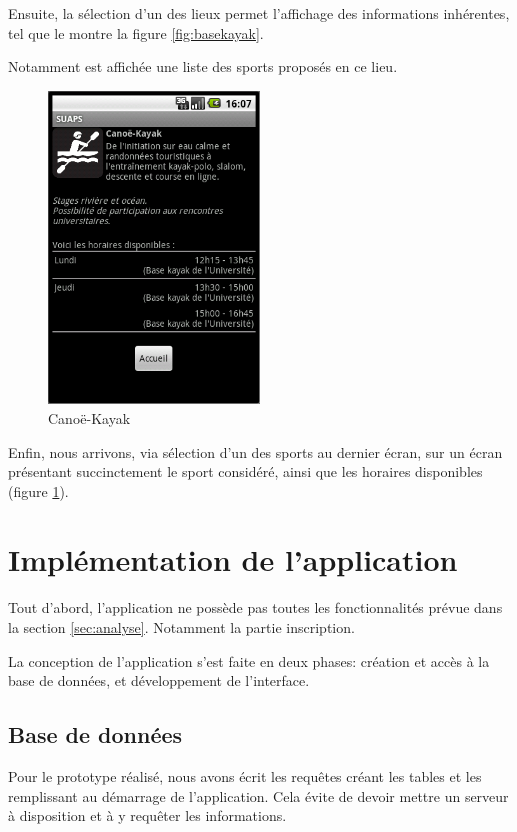 \documentclass[french, titlepage, 11pt, a4paper]{article}
\begin{document}
	Ensuite, la sélection d'un des lieux permet l'affichage des informations
	inhérentes, tel que le montre la figure \ref{fig:basekayak}.

	Notamment est affichée une liste des sports proposés en ce lieu.

	\begin{figure}[ht]
		\centering
		\includegraphics[width=0.5\textwidth]{canoekayak.png}
		\caption{Canoë-Kayak}
		\label{fig:canoekayak}
	\end{figure}

	Enfin, nous arrivons, via sélection d'un des sports au dernier écran, sur un
	écran présentant succinctement le sport considéré, ainsi que les horaires
	disponibles (figure \ref{fig:canoekayak}).

\section{Implémentation de l'application}

    Tout d'abord, l'application ne possède pas toutes les fonctionnalités prévue
    dans la section \ref{sec:analyse}. Notamment la partie inscription.


    La conception de l'application s'est faite en deux phases: création et accès
    à la base de données, et développement de l'interface.

    \subsection{Base de données}

        Pour le prototype réalisé, nous avons écrit les requêtes créant les
        tables et les remplissant au démarrage de l'application. Cela évite de
        devoir mettre un serveur à disposition et à y requêter les informations.
\end{document}
